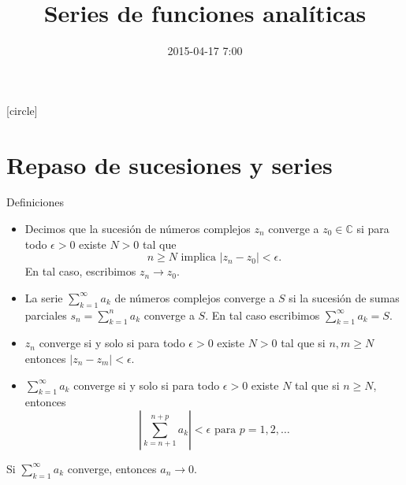 \documentclass[spanish,presentation]{beamer}
\date{2015-04-17 7:00}
\title{Series de funciones analíticas}
\begin{document}
\maketitle
{}
[circle]

\tableofcontents

\section{Repaso de sucesiones y series}
\label{sec-1}

\begin{frame}[label=sec-1-1]{Definiciones}
\begin{definition}[Convergencia]
\begin{itemize}
\item Decimos que la sucesión de números complejos \(z_{n}\) \alert{converge}
      a \(z_{0}\in \mathbb{C}\) si para todo \(\epsilon>0\) existe \(N>0\)
      tal que 
\begin{displaymath}
n\geq N \text{ implica } |z_{n}-z_{0}|<\epsilon.
\end{displaymath}
En tal caso, escribimos \(z_{n}\to z_{0}\).
\item La serie \(\sum_{k=1}^{\infty}a_{k}\) de números complejos \alert{converge}
a \(S\) si la sucesión de sumas parciales
\(s_{n}=\sum_{k=1}^{n}a_{k}\) converge a \(S\). En tal caso
escribimos \(\sum_{k=1}^{\infty}a_{k}=S\).
\end{itemize}
\end{definition}
\end{frame}

\begin{frame}[label=sec-1-2]{}
\begin{theorem}
\begin{itemize}
\item \(z_{n}\) converge si y solo si para todo \(\epsilon>0\) existe
\(N>0\) tal que si \(n,m\geq N\) entonces \(|z_{n}-z_{m}|<\epsilon\).
\item \(\sum_{k=1}^{\infty}a_{k}\) converge si y solo si para todo
\(\epsilon>0\) existe \(N\) tal que si \(n\geq N\), entonces
\begin{displaymath}
\left| \sum_{k=n+1}^{n+p}a_{k} \right|<\epsilon\text{ para \(p=1,2,\ldots\)}
\end{displaymath}
\end{itemize}
\end{theorem}

\begin{corollary}
Si \(\sum_{k=1}^{\infty}a_{k}\) converge, entonces \(a_{n}\to 0\).
\end{corollary}
\end{frame}
\end{document}
